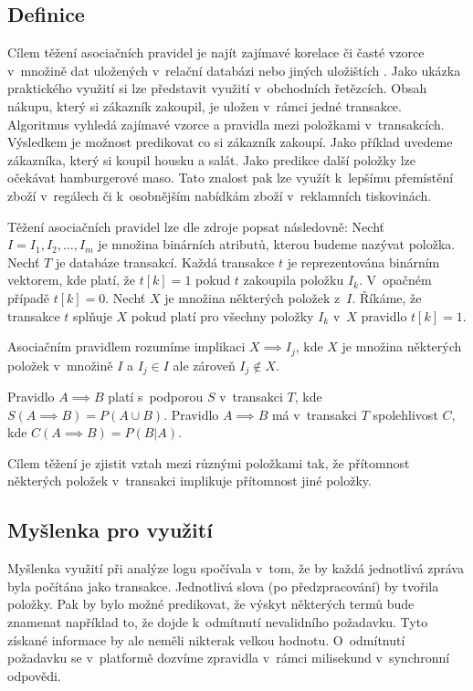 \documentclass[thesis=M,czech]{FITthesis}[2012/10/20]
\begin{document}
		\subsection{Definice}
		Cílem těžení asociačních pravidel je najít zajímavé korelace či časté vzorce v~množině dat uložených v~relační databázi nebo jiných uložištích \cite{assoc1}. Jako ukázka praktického využití si lze představit využití v~obchodních řetězcích. Obsah nákupu, který si zákazník zakoupil, je uložen v~rámci jedné transakce. Algoritmus vyhledá zajímavé vzorce a pravidla mezi položkami v~transakcích. Výsledkem je možnost predikovat co si zákazník zakoupí. Jako příklad uvedeme zákazníka, který si koupil housku a salát. Jako predikce další položky lze očekávat hamburgerové maso. Tato znalost pak lze využít k~lepšímu přemístění zboží v~regálech či k~osobnějším nabídkám zboží v~reklamních tiskovinách.
		
		Těžení asociačních pravidel lze dle zdroje \cite{AsocAgrawal1} popsat následovně: Nechť $I = I_1, I_2,\ldots,I_m$ je množina binárních atributů, kterou budeme nazývat položka. Nechť $T$ je databáze transakcí. Každá transakce $t$ je reprezentována binárním vektorem, kde platí, že $t[k] = 1$ pokud $t$ zakoupila položku $I_k$. V~opačném případě $t[k] = 0$. Nechť $X$  je množina některých položek z~$I$. Říkáme, že transakce $t$ splňuje $X$ pokud platí pro všechny položky $I_k$ v~$X$ pravidlo $t[k] = 1$.	
			
		Asociačním pravidlem rozumíme implikaci $X \implies I_j$, kde $X$ je množina některých položek v~množině $I$ a $I_j \in I$ ale zároveň $I_j \notin X$.
		
		Pravidlo $A \implies B$ platí s~podporou $S$ v~transakci $T$, kde $S(A \implies B) = P(A \cup B)$. Pravidlo $A \implies B$ má v~transakci $T$ spolehlivost $C$, kde $C(A \implies B) = P(B|A)$.
		
		Cílem těžení je zjistit vztah mezi různými položkami tak, že přítomnost některých položek v~transakci implikuje přítomnost jiné položky.
		
		\subsection{Myšlenka pro využití}
		Myšlenka využití při analýze logu spočívala v~tom, že by každá jednotlivá zpráva byla počítána jako transakce. Jednotlivá slova (po předzpracování) by tvořila položky. Pak by bylo možné predikovat, že výskyt některých termů bude znamenat například to, že dojde k~odmítnutí nevalidního požadavku. Tyto získané informace by ale neměli nikterak velkou hodnotu. O~odmítnutí požadavku se v~platformě dozvíme zpravidla v~rámci milisekund v~synchronní odpovědi.
		
\end{document}
